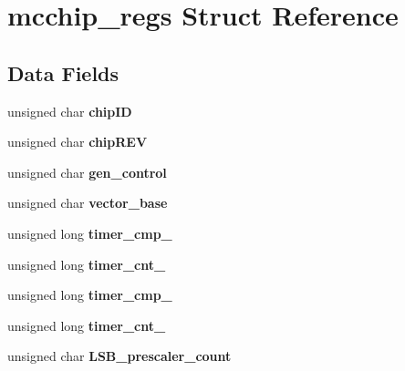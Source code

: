 \hypertarget{structmcchip__regs}{}\section{mcchip\+\_\+regs Struct Reference}
\label{structmcchip__regs}
\subsection*{Data Fields}
\begin{DoxyCompactItemize}
\item 
\mbox{\label{structmcchip__regs_ad1dfa9e9e11394935871f5be97efa01b}} 
unsigned char {\bfseries chip\+ID}
\item 
\mbox{\label{structmcchip__regs_a1ef50128e69d2c06f8f1b8248212afdc}} 
unsigned char {\bfseries chip\+R\+EV}
\item 
\mbox{\label{structmcchip__regs_a5a05e6241b868cdc86d5931280e66d2d}} 
unsigned char {\bfseries gen\+\_\+control}
\item 
\mbox{\label{structmcchip__regs_ad2f136c29fe10c6b8dbbc6a284e05abd}} 
unsigned char {\bfseries vector\+\_\+base}
\item 
\mbox{\label{structmcchip__regs_a2f3e16042c4dfb73fc14f6cf99d8123e}} 
unsigned long {\bfseries timer\+\_\+cmp\+\_}
\item 
\mbox{\label{structmcchip__regs_a3540e8b6bfd0d2c2059654111087a01c}} 
unsigned long {\bfseries timer\+\_\+cnt\+\_}
\item 
\mbox{\label{structmcchip__regs_a030b6b3ae85a9a95129a0877644e2115}} 
unsigned long {\bfseries timer\+\_\+cmp\+\_}
\item 
\mbox{\label{structmcchip__regs_a55c901ec19406367c3bc1d175fe5830c}} 
unsigned long {\bfseries timer\+\_\+cnt\+\_}
\item 
\mbox{\label{structmcchip__regs_ad6fa1fa226afe9cddf64e291f3e1547b}} 
unsigned char {\bfseries L\+S\+B\+\_\+prescaler\+\_\+count}

\end{DoxyCompactItemize}
